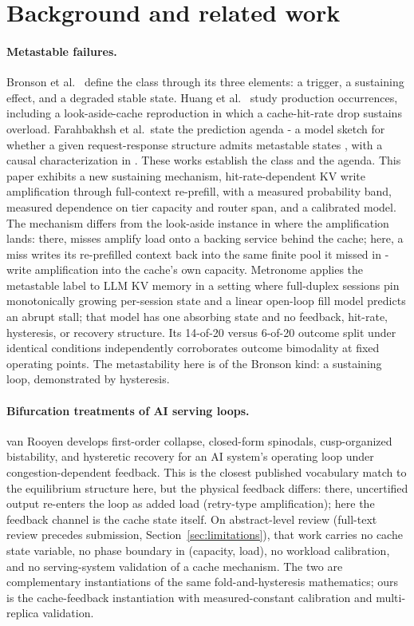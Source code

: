 \section{Background and related work}
\label{sec:related}

\paragraph{Metastable failures.} Bronson et al.\ \cite{bronson2021metastable} define
the class through its three elements: a trigger, a sustaining
effect, and a degraded stable state. Huang et al.\ \cite{huang2022wild}
study production occurrences, including a look-aside-cache
reproduction in which a cache-hit-rate drop sustains overload.
Farahbakhsh et al.\ state the prediction agenda - a model sketch for
whether a given request-response structure admits metastable states
\cite{farahbakhsh2025modeling}, with a causal characterization in
\cite{farahbakhsh2026characterizing}. These works establish the class and
the agenda. This paper exhibits a new sustaining mechanism,
hit-rate-dependent KV write amplification through full-context
re-prefill, with a measured probability band, measured dependence on
tier capacity and router span, and a calibrated model. The mechanism
differs from the look-aside instance in where the amplification
lands: there, misses amplify load onto a backing service behind the
cache; here, a miss writes its re-prefilled context back into the
same finite pool it missed in - write amplification into the cache's
own capacity. Metronome \cite{meng2026metronome} applies the metastable
label to LLM KV memory in a setting where full-duplex sessions pin
monotonically growing per-session state and a linear open-loop fill
model predicts an abrupt stall; that model has one absorbing state
and no feedback, hit-rate, hysteresis, or recovery structure. Its
14-of-20 versus 6-of-20 outcome split under identical conditions
independently corroborates outcome bimodality at fixed operating
points. The metastability here is of the Bronson kind: a sustaining
loop, demonstrated by hysteresis.

\paragraph{Bifurcation treatments of AI serving loops.} van Rooyen
\cite{vanrooyen2026collapse} develops first-order collapse, closed-form
spinodals, cusp-organized bistability, and hysteretic recovery for
an AI system's operating loop under congestion-dependent feedback.
This is the closest published vocabulary match to the equilibrium
structure here, but the physical feedback differs: there,
uncertified output re-enters the loop as added load (retry-type
amplification); here the feedback channel is the cache state itself.
On abstract-level review (full-text review precedes submission,
Section~\ref{sec:limitations}), that work carries no cache state variable, no phase
boundary in (capacity, load), no workload calibration, and no
serving-system validation of a cache mechanism. The two are
complementary instantiations of the same fold-and-hysteresis
mathematics; ours is the cache-feedback instantiation with
measured-constant calibration and multi-replica validation.

